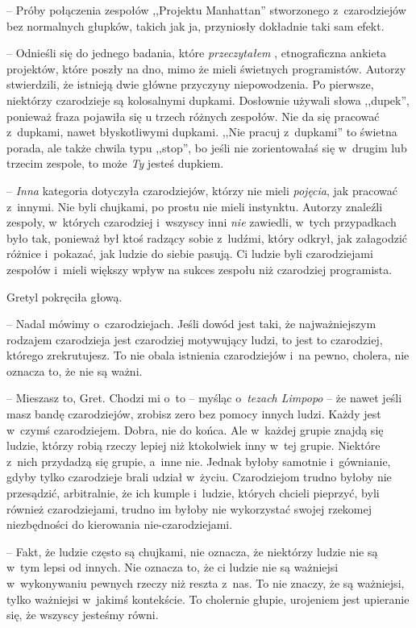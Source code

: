 \documentclass[oneside,polish,11pt,sfheadings]{mwbk}
\begin{document}
-- Próby połączenia zespołów ,,Projektu Manhattan'' stworzonego z~czarodziejów bez normalnych głupków, takich jak ja, przyniosły dokładnie
taki sam efekt.

-- Odnieśli się do jednego badania, które \textit{przeczytałem },
etnograficzna ankieta projektów, które poszły na dno, mimo że mieli
świetnych programistów. Autorzy stwierdzili, że istnieją dwie główne
przyczyny niepowodzenia. Po pierwsze, niektórzy czarodzieje są
kolosalnymi dupkami. Dosłownie używali słowa ,,dupek'', ponieważ fraza
pojawiła się u trzech różnych zespołów. Nie da się pracować z~dupkami,
nawet błyskotliwymi dupkami. ,,Nie pracuj z~dupkami'' to świetna porada,
ale także chwila typu ,,stop'', bo jeśli nie zorientowałaś się w~drugim
lub trzecim zespole, to może \textit{Ty} jesteś dupkiem.

-- \textit{Inna} kategoria dotyczyła czarodziejów, którzy nie mieli
\textit{pojęcia}, jak pracować z~innymi. Nie byli chujkami, po prostu nie
mieli instynktu. Autorzy znaleźli zespoły, w~których czarodziej i~wszyscy inni \textit{nie} zawiedli, w~tych przypadkach było tak, ponieważ
był ktoś radzący sobie z~ludźmi, który odkrył, jak załagodzić różnice i~pokazać, jak ludzie do siebie pasują. Ci ludzie byli czarodziejami
zespołów i~mieli większy wpływ na sukces zespołu niż czarodziej
programista.

Gretyl pokręciła głową. 

-- Nadal mówimy o~czarodziejach. Jeśli dowód jest
taki, że najważniejszym rodzajem czarodzieja jest czarodziej motywujący
ludzi, to jest to czarodziej, którego zrekrutujesz. To nie obala
istnienia czarodziejów i~na pewno, cholera, nie oznacza to, że nie są
ważni.

-- Mieszasz to, Gret. Chodzi mi o~to -- myśląc o~\textit{tezach Limpopo} -- że nawet jeśli masz bandę czarodziejów, zrobisz zero bez pomocy innych
ludzi. Każdy jest w~czymś czarodziejem. Dobra, nie do końca. Ale w~każdej grupie znajdą się ludzie, którzy robią rzeczy lepiej niż
ktokolwiek inny w~tej grupie. Niektóre z~nich przydadzą się grupie, a~inne nie. Jednak byłoby samotnie i~gównianie, gdyby tylko czarodzieje
brali udział w~życiu. Czarodziejom trudno byłoby nie przesądzić,
arbitralnie, że ich kumple i~ludzie, których chcieli pieprzyć, byli
również czarodziejami, trudno im byłoby nie wykorzystać swojej rzekomej
niezbędności do kierowania nie-czarodziejami.

-- Fakt, że ludzie często są chujkami, nie oznacza, że niektórzy ludzie
nie są w~tym lepsi od innych. Nie oznacza to, że ci ludzie nie są
ważniejsi w~wykonywaniu pewnych rzeczy niż reszta z~nas. To nie znaczy,
że są ważniejsi, tylko ważniejsi w~jakimś kontekście. To cholernie
głupie, urojeniem jest upieranie się, że wszyscy jesteśmy równi.
\end{document}
